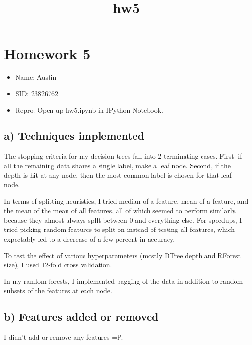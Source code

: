 \documentclass{article}
\title{hw5}
\begin{document}
    
    
    \maketitle
    
    

    
    \section{Homework 5}\label{homework-5}

\begin{itemize}
\itemsep1pt\parskip0pt
\item
  Name: Austin
\item
  SID: 23826762
\item
  Repro: Open up hw5.ipynb in IPython Notebook.
\end{itemize}

\subsection{a) Techniques implemented}\label{a-techniques-implemented}

The stopping criteria for my decision trees fall into 2 terminating
cases. First, if all the remaining data shares a single label, make a
leaf node. Second, if the depth is hit at any node, then the most common
label is chosen for that leaf node.

In terms of splitting heuristics, I tried median of a feature, mean of a
feature, and the mean of the mean of all features, all of which seemed
to perform similarly, because they almost always spllt between 0 and
everything else. For speedups, I tried picking random features to split
on instead of testing all features, which expectably led to a decrease
of a few percent in accuracy.

To test the effect of various hyperparameters (mostly DTree depth and
RForest size), I used 12-fold cross validation.

In my random forests, I implemented bagging of the data in addition to
random subsets of the features at each node.

\subsection{b) Features added or
removed}\label{b-features-added-or-removed}

I didn't add or remove any features =P.
\end{document}
